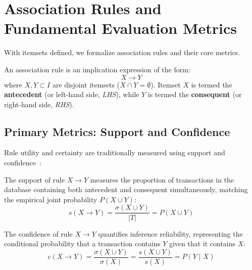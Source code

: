 \section{Association Rules and Fundamental Evaluation Metrics}
\label{sec:dm-association-rules-metrics}

With itemsets defined, we formalize association rules and their core metrics.

\begin{definition}
An association rule is an implication expression of the form:
\begin{equation}
\label{eq:dm-rule-definition-en}
X \longrightarrow Y
\end{equation}
where $X, Y \subset I$ are disjoint itemsets ($X \cap Y = \emptyset$). Itemset $X$ is termed the \textbf{antecedent} (or left-hand side, \textit{LHS}), while $Y$ is termed the \textbf{consequent} (or right-hand side, \textit{RHS}).
\end{definition}

\subsection{Primary Metrics: Support and Confidence}
Rule utility and certainty are traditionally measured using support and confidence~\cite{agrawal1993, tan2018}:

\begin{definition}
The support of rule $X \rightarrow Y$ measures the proportion of transactions in the database containing both antecedent and consequent simultaneously, matching the empirical joint probability $P(X \cup Y)$:
\begin{equation}
\label{eq:dm-rule-support-en}
s(X \longrightarrow Y) = \frac{\sigma(X \cup Y)}{|T|} = P(X \cup Y)
\end{equation}
\end{definition}

\begin{definition}
The confidence of rule $X \rightarrow Y$ quantifies inference reliability, representing the conditional probability that a transaction contains $Y$ given that it contains $X$:
\begin{equation}
\label{eq:dm-rule-confidence-en}
c(X \longrightarrow Y) = \frac{\sigma(X \cup Y)}{\sigma(X)} = \frac{s(X \cup Y)}{s(X)} = P(Y \mid X)
\end{equation}
\end{definition}


